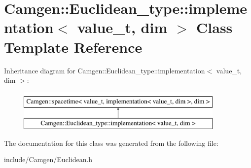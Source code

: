 \hypertarget{a00299}{}\section{Camgen\+:\+:Euclidean\+\_\+type\+:\+:implementation$<$ value\+\_\+t, dim $>$ Class Template Reference}
\label{a00299}
Inheritance diagram for Camgen\+:\+:Euclidean\+\_\+type\+:\+:implementation$<$ value\+\_\+t, dim $>$\+:\begin{figure}[H]
\begin{center}
\leavevmode
\includegraphics[height=2.000000cm]{a00299}
\end{center}
\end{figure}


The documentation for this class was generated from the following file\+:\begin{DoxyCompactItemize}
\item 
include/\+Camgen/Euclidean.\+h\end{DoxyCompactItemize}

